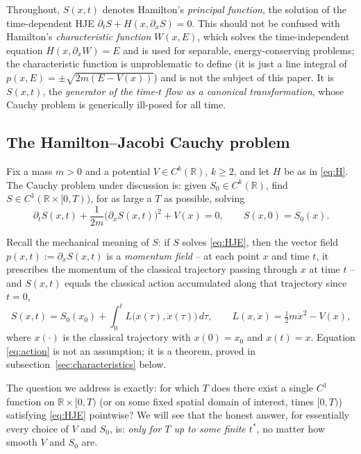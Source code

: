 \begin{remark}
    Throughout, $S(x,t)$ denotes Hamilton's \emph{principal function}, the solution
    of the time-dependent HJE $\partial_tS + H(x,\partial_xS)=0$. This should
    not be confused with Hamilton's \emph{characteristic function} $W(x,E)$,
    which solves the time-independent equation $H(x,\partial_xW)=E$ and is used
    for separable, energy-conserving problems; the characteristic function is
    unproblematic to define (it is just a line integral of
    $p(x,E)=\pm\sqrt{2m(E-V(x))}$) and is not the subject of this paper. It is
    $S(x,t)$, the \emph{generator of the time-$t$ flow as a canonical
    transformation}, whose Cauchy problem is generically ill-posed for all
    time.
\end{remark}

\subsection{The Hamilton--Jacobi Cauchy problem}
\label{sec:setup}

Fix a mass $m>0$ and a potential $V\in C^k(\mathbb{R})$, $k\ge 2$, and let $H$
be as in \eqref{eq:H}. The Cauchy problem under discussion is: given 
$S_0 \in C^k(\mathbb{R})$, 
find $S\in C^1(\mathbb{R}\times[0,T))$, for as large a $T$ as
possible, solving
\begin{equation}
\partial_t S(x,t) + \frac{1}{2m}\big(\partial_x S(x,t)\big)^2 + V(x) = 0, \qquad S(x,0)=S_0(x).
\label{eq:HJE}
\end{equation}

Recall the mechanical meaning of $S$: if $S$ solves \eqref{eq:HJE}, then the
vector field $p(x,t):=\partial_xS(x,t)$ is a \emph{momentum field} -- at each
point $x$ and time $t$, it prescribes the momentum of the classical trajectory
passing through $x$ at time $t$ -- and $S(x,t)$ equals the classical action
accumulated along that trajectory since $t=0$,
\begin{equation}
S(x,t) = S_0(x_0) + \int_0^t L\big(x(\tau),\dot x(\tau)\big)\,d\tau, \qquad L(x,\dot x)=\tfrac12 m\dot x^2 - V(x),
\label{eq:action}
\end{equation}
where $x(\cdot)$ is the classical trajectory with $x(0)=x_0$ and $x(t)=x$.
Equation \eqref{eq:action} is not an assumption; it is a theorem, proved in
subsection~\ref{sec:characteristics} below.

The question we address is exactly: for which $T$ does there exist a single
$C^1$ function on $\mathbb{R}\times[0,T)$ (or on some fixed spatial domain of
interest, times $[0,T)$) satisfying \eqref{eq:HJE} pointwise? We will see that
the honest answer, for essentially every choice of $V$ and $S_0$, is:
\emph{only for $T$ up to some finite $t^\ast$}, no matter how smooth $V$ and
$S_0$ are.


